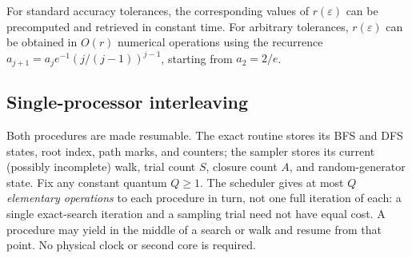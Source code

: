 \documentclass[conference]{IEEEtran}
\begin{document}
For standard accuracy tolerances, the corresponding
values of $r(\varepsilon)$ can be precomputed and
retrieved in constant time. For arbitrary tolerances,
$r(\varepsilon)$ can be obtained in $O(r)$ numerical
operations using the recurrence
$a_{j+1}=a_j e^{-1}(j/(j-1))^{j-1}$, starting
from $a_2=2/e$.
\subsection{Single-processor interleaving}
Both procedures are made resumable. The exact routine stores
its BFS and DFS states, root index, path marks, and counters;
the sampler stores its current (possibly incomplete) walk,
trial count $S$, closure count $A$, and random-generator state.
Fix any constant quantum $Q\ge1$. The scheduler gives at most
$Q$ \emph{elementary operations} to each procedure in turn,
not one full iteration of each: a single exact-search
iteration and a sampling trial need not have equal cost.
A procedure may yield in the middle of a search or walk and
resume from that point. No physical clock or second core is
required.
\end{document}
